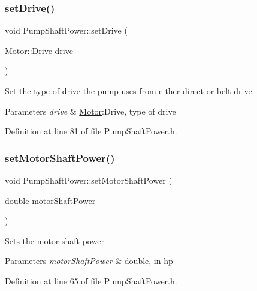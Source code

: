 \subsubsection{\texorpdfstring{set\+Drive()}{setDrive()}}
{\footnotesize\ttfamily void Pump\+Shaft\+Power\+::set\+Drive (\begin{DoxyParamCaption}\item[{Motor\+::\+Drive}]{drive }\end{DoxyParamCaption})\hspace{0.3cm}{\ttfamily [inline]}}

Set the type of drive the pump uses from either direct or belt drive 
\begin{DoxyParams}{Parameters}
{\em drive} & \hyperlink{struct_motor}{Motor}\+:Drive, type of drive \\
\hline
\end{DoxyParams}


Definition at line 81 of file Pump\+Shaft\+Power.\+h.

\mbox{\label{class_pump_shaft_power_a77b8c621c7c92841dbd00112437c413b}} 
\subsubsection{\texorpdfstring{set\+Motor\+Shaft\+Power()}{setMotorShaftPower()}}
{\footnotesize\ttfamily void Pump\+Shaft\+Power\+::set\+Motor\+Shaft\+Power (\begin{DoxyParamCaption}\item[{double}]{motor\+Shaft\+Power }\end{DoxyParamCaption})\hspace{0.3cm}{\ttfamily [inline]}}

Sets the motor shaft power 
\begin{DoxyParams}{Parameters}
{\em motor\+Shaft\+Power} & double, in hp \\
\hline
\end{DoxyParams}


Definition at line 65 of file Pump\+Shaft\+Power.\+h.

\mbox{\label{class_pump_shaft_power_a7d2c64ba11fb287d9b46f7d0890ee988}} 
